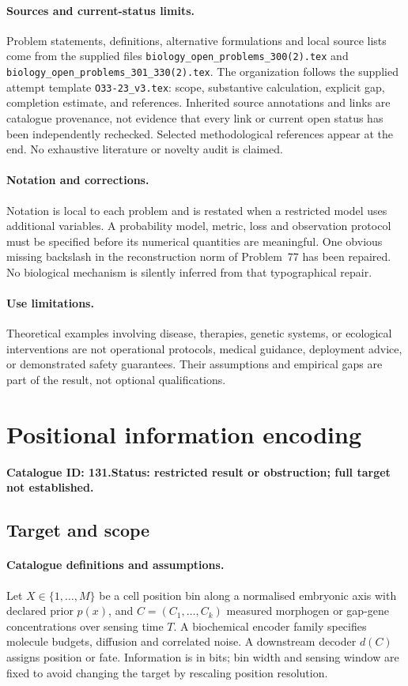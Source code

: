 \documentclass[11pt]{article}
\begin{document}
\paragraph{Sources and current-status limits.}
Problem statements, definitions, alternative formulations and local source lists
come from the supplied files
\texttt{biology\_open\_problems\_300(2).tex} and
\texttt{biology\_open\_problems\_301\_330(2).tex}.
The organization follows the supplied attempt template
\texttt{O33-23\_v3.tex}: scope, substantive calculation, explicit gap,
completion estimate, and references. Inherited source annotations and links are
catalogue provenance, not evidence that every link or current open status has
been independently rechecked. Selected methodological references appear at the
end. No exhaustive literature or novelty audit is claimed.

\paragraph{Notation and corrections.}
Notation is local to each problem and is restated when a restricted model uses
additional variables. A probability model, metric, loss and observation protocol
must be specified before its numerical quantities are meaningful. One obvious
missing backslash in the reconstruction norm of Problem~77 has been repaired.
No biological mechanism is silently inferred from that typographical repair.

\paragraph{Use limitations.}
Theoretical examples involving disease, therapies, genetic systems, or ecological
interventions are not operational protocols, medical guidance, deployment advice,
or demonstrated safety guarantees. Their assumptions and empirical gaps are part
of the result, not optional qualifications.

\setcounter{section}{130}
\section{Positional information encoding}
\label{prob:131}
\noindent\textbf{Catalogue ID: 131.}\quad \textbf{Status: restricted result or obstruction; full target not established.}
\subsection{Target and scope}
\paragraph{Catalogue definitions and assumptions.}
Let $X\in\{1,\ldots,M\}$ be a cell position bin along a normalised embryonic axis with declared prior $p(x)$, and $C=(C_1,\ldots,C_k)$ measured morphogen or gap-gene concentrations over sensing time $T$. A biochemical encoder family specifies molecule budgets, diffusion and correlated noise. A downstream decoder $d(C)$ assigns position or fate. Information is in bits; bin width and sensing window are fixed to avoid changing the target by rescaling position resolution.
\end{document}
